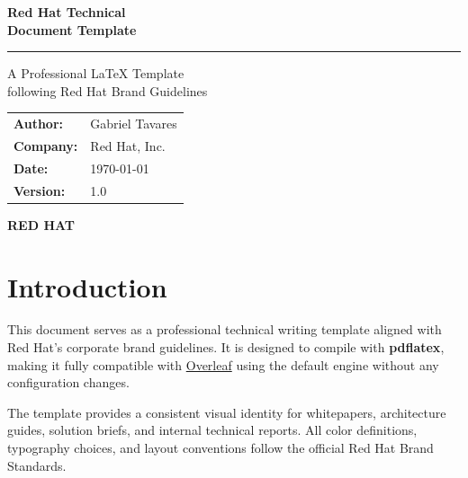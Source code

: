 \documentclass[11pt,a4paper]{article}
\begin{document}
\thispagestyle{empty}
\color{RHWhite}

\vspace*{2.5cm}

{\fontsize{28}{34}\selectfont\bfseries Red Hat Technical\\[0.3cm]Document Template}

\vspace{0.6cm}
\noindent\textcolor{RHWhite}{\rule{\textwidth}{1pt}}
\vspace{0.4cm}

{\large A Professional \LaTeX{} Template\\following Red Hat Brand Guidelines}

\vfill

\begin{tabular}{ll}
    \textbf{Author:}  & Gabriel Tavares \\[2pt]
    \textbf{Company:} & Red Hat, Inc.   \\[2pt]
    \textbf{Date:}    & \today          \\[2pt]
    \textbf{Version:} & 1.0             \\
\end{tabular}

\vspace{1.5cm}
\begin{flushright}
    {\LARGE\bfseries RED HAT}
\end{flushright}

\afterpage{\restorepagecolor}
\newpage
\color{RHBlack}

\tableofcontents
\newpage

\section{Introduction}

This document serves as a professional technical writing template aligned with Red Hat's corporate brand guidelines. It is designed to compile with \textbf{pdflatex}, making it fully compatible with \href{https://www.overleaf.com}{Overleaf} using the default engine without any configuration changes.

The template provides a consistent visual identity for whitepapers, architecture guides, solution briefs, and internal technical reports. All color definitions, typography choices, and layout conventions follow the official Red Hat Brand Standards.
\end{document}
